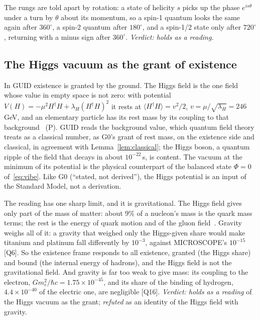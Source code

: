 \documentclass[11pt,a4paper]{article}
\theoremstyle{definition}
\theoremstyle{remark}
\newcommand{\chk}[1]{\textsf{[#1]}}
\newcommand{\tagP}{\textsf{(P)}}
\theoremstyle{definition}
\begin{document}
\noindent The rungs are told apart by rotation: a state of helicity $s$ picks up the phase $e^{is\theta}$ under a turn by $\theta$ about its
momentum, so a spin-1 quantum looks the same again after $360^\circ$, a spin-2 quantum after $180^\circ$, and a spin-1/2 state only after
$720^\circ$, returning with a minus sign after $360^\circ$. \emph{Verdict: holds as a reading.}

\subsection{The Higgs vacuum as the grant of existence}

In GUID existence is granted by the ground. The Higgs field is the one field whose value in empty space is not zero: with potential
$V(H)=-\mu^2H^\dagger H+\lambda_H(H^\dagger H)^2$ it rests at $\langle H^\dagger H\rangle=v^2/2$, $v=\mu/\sqrt{\lambda_H}=246$\,GeV, and an
elementary particle has its rest mass by its coupling to that background~\cite{higgs64,be64} \tagP. GUID reads the background value, which
quantum field theory treats as a classical number, as G0's grant of rest mass, on the existence side and classical, in agreement with
Lemma~\ref{lem:classical}; the Higgs boson, a quantum ripple of the field that decays in about $10^{-22}$\,s, is content. The vacuum at the
minimum of its potential is the physical counterpart of the balanced state $\Phi=0$ of~\eqref{eq:vibe}. Like G0 (``stated, not
derived''), the Higgs potential is an input of the Standard Model, not a derivation.

The reading has one sharp limit, and it is gravitational. The Higgs field gives only part of the mass of matter: about 9\% of a nucleon's
mass is the quark mass terms; the rest is the energy of quark motion and of the gluon field~\cite{yang}. Gravity weighs all of it: a gravity
that weighed only the Higgs-given share would make titanium and platinum fall differently by $10^{-3}$, against MICROSCOPE's
$10^{-15}$ \chk{Q6}. So the existence frame responds to all existence, granted (the Higgs share) and bound (the internal energy of
hadrons), and the Higgs field is not the gravitational field. And gravity is far too weak to give mass: its coupling to the electron,
$Gm_e^2/\hbar c=1.75\times10^{-45}$, and its share of the binding of hydrogen, $4.4\times10^{-40}$ of the electric one, are negligible
\chk{Q16}. \emph{Verdict: holds as a reading} of the Higgs vacuum as the grant; \emph{refuted} as an identity of the Higgs field with
gravity.
\end{document}
